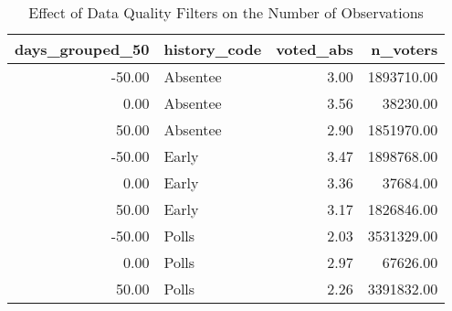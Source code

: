 \begin{table}[!htb]
\centering
\caption{Effect of Data Quality Filters on the Number of Observations} 
\label{table:tab13}
\begingroup\small
\begin{tabular}{rlrr}
  \hline
days\_grouped\_50 & history\_code & voted\_abs & n\_voters \\ 
  \hline
-50.00 & Absentee & 3.00 & 1893710.00 \\ 
  0.00 & Absentee & 3.56 & 38230.00 \\ 
  50.00 & Absentee & 2.90 & 1851970.00 \\ 
  -50.00 & Early & 3.47 & 1898768.00 \\ 
  0.00 & Early & 3.36 & 37684.00 \\ 
  50.00 & Early & 3.17 & 1826846.00 \\ 
  -50.00 & Polls & 2.03 & 3531329.00 \\ 
  0.00 & Polls & 2.97 & 67626.00 \\ 
  50.00 & Polls & 2.26 & 3391832.00 \\ 
   \hline
\end{tabular}
\endgroup
\end{table}

